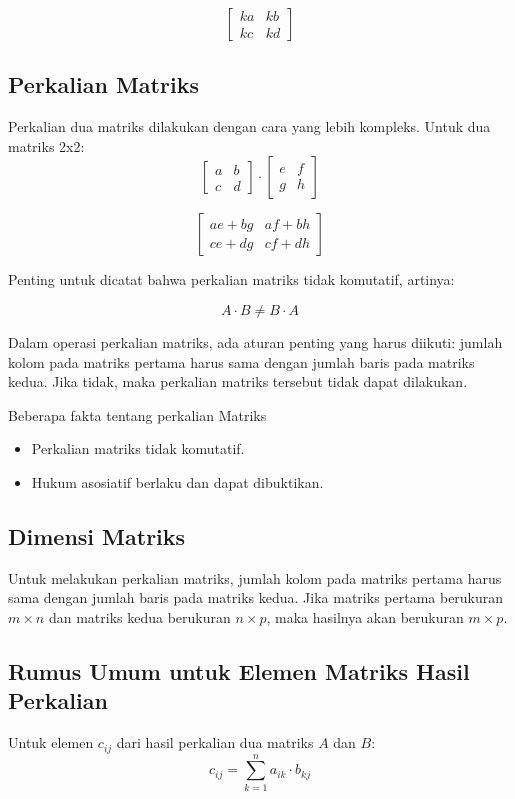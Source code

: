 \documentclass{article}
\begin{document}
\[\begin{bmatrix} ka & kb \\ kc & kd \end{bmatrix} \]

\subsection{Perkalian Matriks}
Perkalian dua matriks dilakukan dengan cara yang lebih kompleks. Untuk dua matriks 2x2:
\[ \begin{bmatrix} a & b \\ c & d \end{bmatrix} \cdot \begin{bmatrix} e & f \\ g & h
    \end{bmatrix}\]

\[\begin{bmatrix} ae + bg & af + bh \\ ce + dg & cf + dh \end{bmatrix} \]

Penting untuk dicatat bahwa perkalian matriks tidak komutatif, artinya:

\[ A \cdot B \neq B \cdot A \]

Dalam operasi perkalian matriks, ada aturan penting yang harus diikuti: jumlah kolom pada matriks pertama harus sama dengan jumlah baris pada matriks kedua. Jika tidak, maka perkalian matriks tersebut tidak dapat dilakukan.

Beberapa fakta tentang perkalian Matriks\begin{itemize}
    \item Perkalian matriks tidak komutatif.
    \item Hukum asosiatif berlaku dan dapat dibuktikan.
\end{itemize}

\subsection{Dimensi Matriks}
Untuk melakukan perkalian matriks, jumlah kolom pada matriks pertama harus sama dengan jumlah baris pada matriks kedua. Jika matriks pertama berukuran \( m \times n \) dan matriks kedua berukuran \( n \times p \), maka hasilnya akan berukuran \( m \times p \).

\subsection{Rumus Umum untuk Elemen Matriks Hasil Perkalian}
Untuk elemen \( c_{ij} \) dari hasil perkalian dua matriks \( A \) dan \( B \):
\[ c_{ij} = \sum_{k=1}^n a_{ik} \cdot b_{kj} \]
\end{document}
